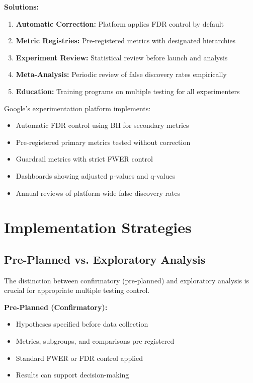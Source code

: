 \textbf{Solutions:}

\begin{enumerate}
    \item \textbf{Automatic Correction:} Platform applies FDR control by default

    \item \textbf{Metric Registries:} Pre-registered metrics with designated hierarchies

    \item \textbf{Experiment Review:} Statistical review before launch and analysis

    \item \textbf{Meta-Analysis:} Periodic review of false discovery rates empirically

    \item \textbf{Education:} Training programs on multiple testing for all experimenters
\end{enumerate}

\begin{example}
Google's experimentation platform implements:
\begin{itemize}
    \item Automatic FDR control using BH for secondary metrics
    \item Pre-registered primary metrics tested without correction
    \item Guardrail metrics with strict FWER control
    \item Dashboards showing adjusted p-values and q-values
    \item Annual reviews of platform-wide false discovery rates
\end{itemize}
\end{example}

\section{Implementation Strategies}

\subsection{Pre-Planned vs. Exploratory Analysis}

The distinction between confirmatory (pre-planned) and exploratory analysis is crucial for appropriate multiple testing control.

\textbf{Pre-Planned (Confirmatory):}

\begin{itemize}
    \item Hypotheses specified before data collection
    \item Metrics, subgroups, and comparisons pre-registered
    \item Standard FWER or FDR control applied
    \item Results can support decision-making
\end{itemize}

